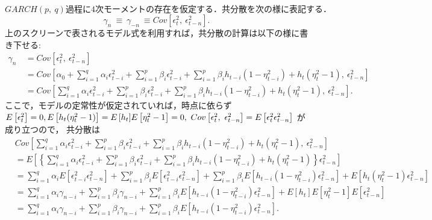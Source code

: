 \documentclass[8pt]{jsarticle}
\def\Exp#1{\mbox{$E \left[ #1 \right]$}}
\def\Cov#1#2{\mbox{$Cov \left[ #1,\ #2 \right]$}}
\begin{document}
\begin{breakbox}
	$GARCH(p,\ q) 過程に 4 次モーメントの存在を仮定する．共分散を次の様に表記する．$
	\[
		\gamma_n\ \equiv\ \gamma_{-n}\ \equiv \Cov{\epsilon_t^2}{\epsilon_{t-n}^2}.
	\]
	上のスクリーンで表されるモデル式を利用すれば，共分散の計算は以下の様に書き下せる:
	\begin{align*}
		\gamma_n\ &= \Cov{\epsilon_t^2}{\epsilon_{t-n}^2} \\
		&= \Cov{\alpha_0 + \sum\limits_{i=1}^{q} \alpha_i \epsilon_{t-i}^2 
			+ \sum\limits_{i=1}^{p} \beta_i \epsilon_{t-i}^2 
			+ \sum\limits_{i=1}^{p} \beta_i h_{t-i}(1 - \eta_{t-i}^2) + h_t(\eta_t^2 - 1)}{\epsilon_{t-n}^2} \\
		&= \Cov{\sum\limits_{i=1}^{q} \alpha_i \epsilon_{t-i}^2 
			+ \sum\limits_{i=1}^{p} \beta_i \epsilon_{t-i}^2 
			+ \sum\limits_{i=1}^{p} \beta_i h_{t-i}(1 - \eta_{t-i}^2) + h_t(\eta_t^2 - 1)}{\epsilon_{t-n}^2}.
	\end{align*}
	ここで，モデルの定常性が仮定されていれば，時点に依らず $\Exp{\epsilon_t^2} = 0,\\
	\Exp{h_t(\eta_t^2 - 1)} = \Exp{h_t}\Exp{\eta_t^2 - 1} = 0,\ \Cov{\epsilon_t^2}{\epsilon_{t-n}^2} = \Exp{\epsilon_t^2 \epsilon_{t-n}^2}$
	が成り立つので，
	共分散は
	\begin{align*}
		&\Cov{\sum\limits_{i=1}^{q} \alpha_i \epsilon_{t-i}^2 
			+ \sum\limits_{i=1}^{p} \beta_i \epsilon_{t-i}^2 
			+ \sum\limits_{i=1}^{p} \beta_i h_{t-i}(1 - \eta_{t-i}^2) + h_t(\eta_t^2 - 1)}{\epsilon_{t-n}^2} \\
		&= \Exp{\left\{ 
			\sum\limits_{i=1}^{q} \alpha_i \epsilon_{t-i}^2 
			+ \sum\limits_{i=1}^{p} \beta_i \epsilon_{t-i}^2 
			+ \sum\limits_{i=1}^{p} \beta_i h_{t-i}(1 - \eta_{t-i}^2) + h_t(\eta_t^2 - 1)
			\right\} \epsilon_{t-n}^2} \\
		&= \sum_{i=1}^{q} \alpha_i \Exp{\epsilon_{t-i}^2 \epsilon_{t-n}^2}
			+ \sum_{i=1}^{p} \beta_i \Exp{\epsilon_{t-i}^2 \epsilon_{t-n}^2}
			+ \sum_{i=1}^{p} \beta_i \Exp{h_{t-i}(1 - \eta_{t-i}^2) \epsilon_{t-n}^2} + \Exp{h_t(\eta_t^2 - 1) \epsilon_{t-n}^2} \\
		&= \sum_{i=1}^{q} \alpha_i \gamma_{n - i} 
			+ \sum_{i=1}^{p} \beta_i \gamma_{n - i} 
			+ \sum_{i=1}^{p} \beta_i \Exp{h_{t-i}(1 - \eta_{t-i}^2) \epsilon_{t-n}^2} + \Exp{h_t}\Exp{\eta_t^2 - 1}\Exp{\epsilon_{t-n}^2} \\
		&= \sum_{i=1}^{q} \alpha_i \gamma_{n - i} 
			+ \sum_{i=1}^{p} \beta_i \gamma_{n - i}  
			+ \sum_{i=1}^{p} \beta_i \Exp{h_{t-i}(1 - \eta_{t-i}^2) \epsilon_{t-n}^2}.
	\end{align*}

\end{breakbox}
\end{document}
